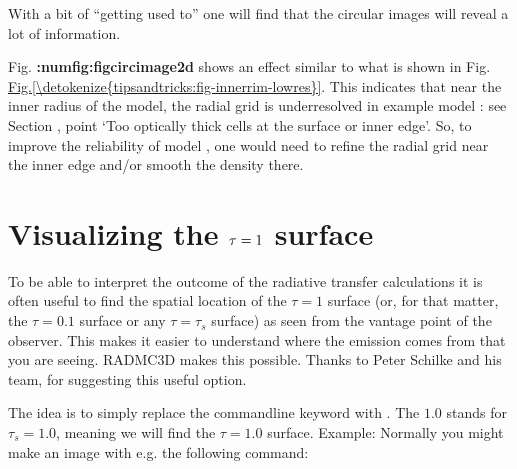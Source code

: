 \documentclass[letterpaper,10pt,english]{sphinxmanual}
\begin{document}
With a bit of “getting used to” one will find that the circular images will
reveal a lot of information.

 Fig. {\color{red}\bfseries{}:numfig:\textasciigrave{}fig\sphinxhyphen{}circ\sphinxhyphen{}image\sphinxhyphen{}2d\textasciigrave{}} shows an effect similar to what is
shown in Fig. \hyperref[\detokenize{tipsandtricks:fig-innerrim-lowres}]{Fig.\@ \ref{\detokenize{tipsandtricks:fig-innerrim-lowres}}}. This indicates that near the inner
radius of the model, the radial grid is under\sphinxhyphen{}resolved in example model
: see Section {\hyperref[\detokenize{tipsandtricks:sec-things-going-wrong}]{}}, point
‘Too optically thick cells at the surface or inner edge’. So, to improve
the reliability of model , one would need to
refine the radial grid near the inner edge and/or smooth the density there.


\section{Visualizing the \protect\(\tau=1\protect\) surface}
\label{\detokenize{imagesspectra:visualizing-the-tau-1-surface}}\label{\detokenize{imagesspectra:sec-tausurf}}
To be able to interpret the outcome of the radiative transfer calculations it is
often useful to find the spatial location of the \(\tau=1\) surface (or, for
that matter, the \(\tau=0.1\) surface or any \(\tau=\tau_s\) surface) as
seen from the vantage point of the observer. This makes it easier to understand
where the emission comes from that you are seeing. RADMC\sphinxhyphen{}3D makes this
possible. Thanks to Peter Schilke and his team, for suggesting this useful
option.

The idea is to simply replace the command\sphinxhyphen{}line keyword  with . The \(1.0\) stands for \(\tau_s=1.0\), meaning we will find the
\(\tau=1.0\) surface. Example: Normally you might make an image with
e.g. the following command:

\begin{sphinxVerbatim}[commandchars=\\\{\}]
       
\end{sphinxVerbatim}
\end{document}
